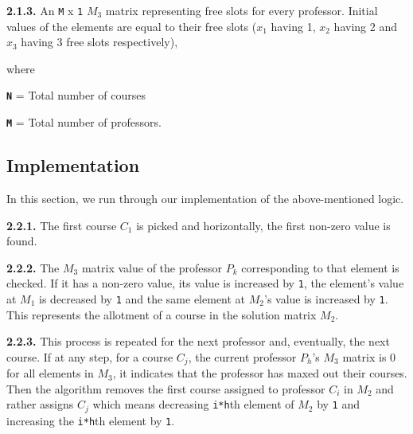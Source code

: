 \documentclass{article}
\begin{document}
    \bigskip
    
    \textbf{2.1.3.} An \texttt{M} x \texttt{1} \texttt{\textbf{$M_3$}} matrix representing free slots for every professor. Initial values of the elements are equal to their free slots (\texttt{$x_1$} having 1, \texttt{$x_2$} having 2 and \texttt{$x_3$} having 3 free slots respectively),

    \bigskip
    
    where 
    
    \textbf{\texttt{N}} = Total number of courses 
    
    \textbf{\texttt{M}} = Total number of professors.

\subsection{Implementation}

\bigskip

In this section, we run through our implementation of the above-mentioned logic.

    \bigskip
    
    \textbf{2.2.1.} The first course \texttt{\textbf{$C_1$}} is picked and horizontally, the first non-zero value is found.

    \bigskip
    
    \textbf{2.2.2.} The \texttt{\textbf{$M_3$}} matrix value of the professor \texttt{\textbf{$P_k$}} corresponding to that element is checked. If it has a non-zero value, its value is increased by \texttt{1}, the element's value at \texttt{\textbf{$M_1$}} is decreased by \texttt{1} and the same element at \texttt{\textbf{$M_2$}}’s value is increased by \texttt{1}. This represents the allotment of a course in the solution matrix \texttt{\textbf{$M_2$}}. 

    \bigskip
    
    \textbf{2.2.3.} This process is repeated for the next professor and, eventually, the next course. If at any step, for a course \texttt{\textbf{$C_j$}}, the current professor \texttt{\textbf{$P_h$}}'s \texttt{\textbf{$M_3$}} matrix is 0 for all elements in \texttt{\textbf{$M_3$}}, it indicates that the professor has maxed out their courses. Then the algorithm removes the first course assigned to professor \texttt{\textbf{$C_i$}} in \texttt{\textbf{$M_2$}} and rather assigns \texttt{\textbf{$C_j$}} which means decreasing \texttt{i*h}th element of \texttt{\textbf{$M_2$}} by \texttt{1} and increasing the \texttt{i*h}th element by \texttt{1}. 
\end{document}
